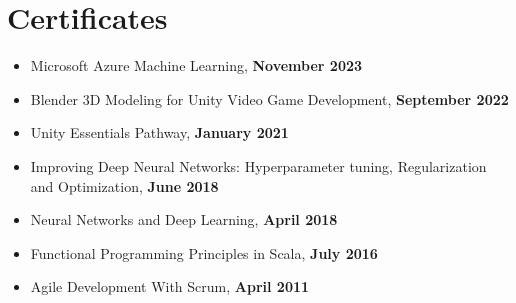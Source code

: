 \section*{Certificates}

\begin{itemize}[noitemsep, nosep]
  \item Microsoft Azure Machine Learning, \textbf{November 2023}
  \item Blender 3D Modeling for Unity Video Game Development, \textbf{September 2022}
  \item Unity Essentials Pathway, \textbf{January 2021}
  \item Improving Deep Neural Networks: Hyperparameter tuning, Regularization and Optimization, \textbf{June 2018}
  \item Neural Networks and Deep Learning, \textbf{April 2018}
  \item Functional Programming Principles in Scala, \textbf{July 2016}
  \item Agile Development With Scrum, \textbf{April 2011}
\end{itemize}

